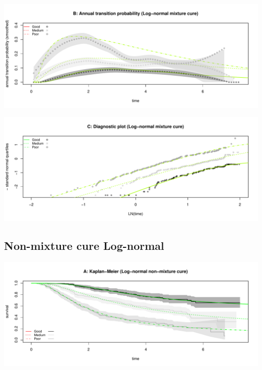 \documentclass[
]{article}
\begin{document}
\begin{flushleft}\includegraphics[height=0.25\textheight]{Images/cure_lnorm_mix-2} \end{flushleft}

\begin{flushleft}\includegraphics[height=0.25\textheight]{Images/cure_lnorm_mix-3} \end{flushleft}

\clearpage

\hypertarget{non-mixture-cure-log-normal}{%
\subsection{Non-mixture cure
Log-normal}\label{non-mixture-cure-log-normal}}

\begin{flushleft}\includegraphics[height=0.25\textheight]{Images/cure_lnorm_nmix-1} \end{flushleft}
\end{document}

